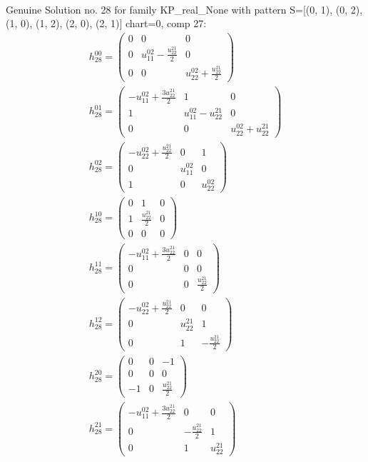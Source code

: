 \documentclass[a4paper, 11pt, twoside, onecolumn]{article}
\begin{document}
\begin{landscape}
\begin{gather*}
\end{gather*} 
Genuine Solution no. 28 for family KP_real_None with pattern S=[(0, 1), (0, 2), (1, 0), (1, 2), (2, 0), (2, 1)] chart=0, comp 27: 
\begin{gather*} 
	 h_{28}^{00}=\begin{pmatrix}0 & 0 & 0\\0 & u^{02}_{11} - \frac{u^{21}_{22}}{2} & 0\\0 & 0 & u^{02}_{22} + \frac{u^{21}_{22}}{2}\end{pmatrix}\\ 
	 h_{28}^{01}=\begin{pmatrix}- u^{02}_{11} + \frac{3 u^{21}_{22}}{2} & 1 & 0\\1 & u^{02}_{11} - u^{21}_{22} & 0\\0 & 0 & u^{02}_{22} + u^{21}_{22}\end{pmatrix}\\ 
	 h_{28}^{02}=\begin{pmatrix}- u^{02}_{22} + \frac{u^{21}_{22}}{2} & 0 & 1\\0 & u^{02}_{11} & 0\\1 & 0 & u^{02}_{22}\end{pmatrix}\\ 
	 h_{28}^{10}=\begin{pmatrix}0 & 1 & 0\\1 & \frac{u^{21}_{22}}{2} & 0\\0 & 0 & 0\end{pmatrix}\\ 
	 h_{28}^{11}=\begin{pmatrix}- u^{02}_{11} + \frac{3 u^{21}_{22}}{2} & 0 & 0\\0 & 0 & 0\\0 & 0 & \frac{u^{21}_{22}}{2}\end{pmatrix}\\ 
	 h_{28}^{12}=\begin{pmatrix}- u^{02}_{22} + \frac{u^{21}_{22}}{2} & 0 & 0\\0 & u^{21}_{22} & 1\\0 & 1 & - \frac{u^{21}_{22}}{2}\end{pmatrix}\\ 
	 h_{28}^{20}=\begin{pmatrix}0 & 0 & -1\\0 & 0 & 0\\-1 & 0 & \frac{u^{21}_{22}}{2}\end{pmatrix}\\ 
	 h_{28}^{21}=\begin{pmatrix}- u^{02}_{11} + \frac{3 u^{21}_{22}}{2} & 0 & 0\\0 & - \frac{u^{21}_{22}}{2} & 1\\0 & 1 & u^{21}_{22}\end{pmatrix}\\ 

\end{gather*}
\end{landscape}
\end{document}
